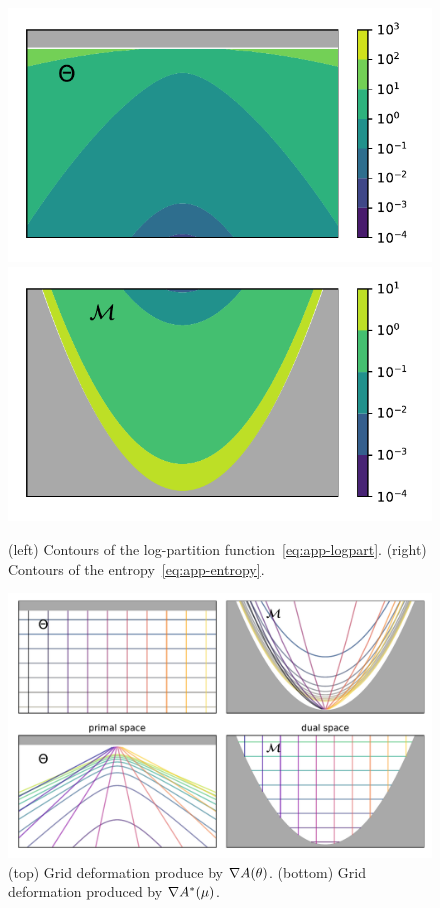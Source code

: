 \begin{figure}[ht]
	\centering
	\includegraphics[width=.45\textwidth]{figs/2d/logpart.pdf}
	\includegraphics[width=.45\textwidth]{figs/2d/entropy.pdf}
	\caption{
	(left) Contours of the log-partition function~\eqref{eq:app-logpart}.
	(right) Contours of the entropy~\eqref{eq:app-entropy}.
	}
	\label{fig:logpart-entropy}
\end{figure}

\begin{figure}[ht]
	\centering
	\includegraphics[width=.9\textwidth]{figs/2d/mirrormap.pdf}
	\caption{
	(top) Grid deformation produce by $\nabla A(\theta)$.
	(bottom) Grid deformation produced by $\nabla{A^*}(\mu)$.
	}
	\label{fig:mirrormaps}
\end{figure}

